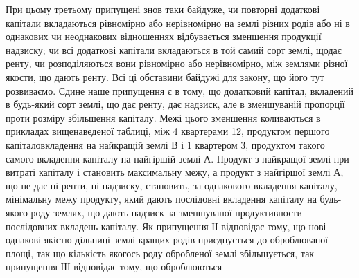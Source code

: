 \noindent{}При цьому третьому припущені знов таки байдуже, чи повторні додаткові
капітали вкладаються рівномірно або нерівномірно на землі різних родів або ні
в однакових чи неоднакових відношеннях відбувається зменшення продукції
надзиску; чи всі додаткові капітали вкладаються в той самий сорт землі, щодає
ренту, чи розподіляються вони рівномірно або нерівномірно, між землями
різної якости, що дають ренту. Всі ці обставини байдужі для закону, що його тут
розвиваємо. Єдине наше припущення є в тому, що додатковий капітал,
вкладений в будь-який сорт землі, що дає ренту, дає надзиск, але в зменшуваній
пропорції проти розміру збільшення капіталу. Межі цього зменшення
коливаються в прикладах вищенаведеної таблиці, між 4 квартерами \deq{} 12,
продуктом першого капіталовкладення на найкращій землі $В$ і 1 квартером
\deq{} 3, продуктом такого самого вкладення капіталу на найгіршій
землі $А$. Продукт з найкращої землі при витраті капіталу і становить максимальну
межу, а продукт з найгіршої землі $А$, що не дає ні ренти, ні надзиску,
становить, за однакового вкладення капіталу, мінімальну межу продукту,
який дають послідовні вкладення капіталу на будь-якого роду землях, що дають надзиск за зменшуваної
продуктивности послідовних вкладень капіталу. Як
припущення ІІ відповідає тому, що нові однакові якістю дільниці землі кращих
родів приєднується до оброблюваної площі, так що кількість якогось роду обробленої
землі збільшується, так припущення ІІІ відповідає тому, що оброблюються
\parbreak{}  %
